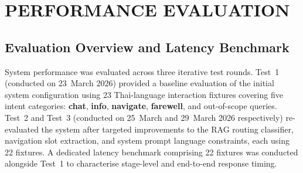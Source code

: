 \section{PERFORMANCE EVALUATION}

\subsection{Evaluation Overview and Latency Benchmark}
System performance was evaluated across three iterative test rounds. Test~1 (conducted on 23~March 2026) provided a baseline evaluation of the initial system configuration using 23 Thai-language interaction fixtures covering five intent categories: \textbf{chat}, \textbf{info}, \textbf{navigate}, \textbf{farewell}, and out-of-scope queries. Test~2 and Test~3 (conducted on 25~March and 29~March 2026 respectively) re-evaluated the system after targeted improvements to the RAG routing classifier, navigation slot extraction, and system prompt language constraints, each using 22 fixtures. A dedicated latency benchmark comprising 22 fixtures was conducted alongside Test~1 to characterise stage-level and end-to-end response timing.

\begin{table}[h]
\captionsetup{justification=raggedright,singlelinecheck=false,margin=0pt,indention=0pt}
\caption{Pipeline Timing Benchmarks: Ollama (1$\times$A100) vs.\ vLLM (4$\times$A100)}
\label{tab:pipeline_timing}
\noindent
{}
\end{table}
\noindent


